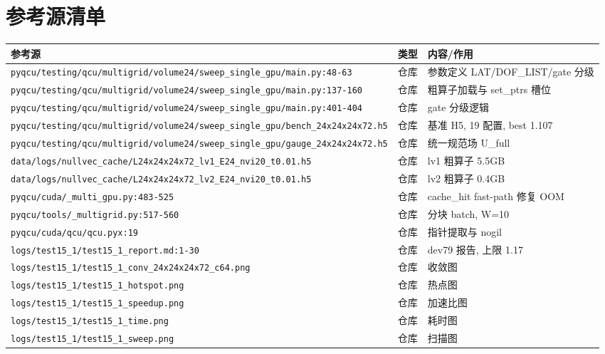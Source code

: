 \documentclass[UTF8]{ctexart}
\begin{document}
\section{参考源清单}
\begin{xltabular}{\textwidth}{llX}
\toprule
\textcolor{evidence}{参考源} & 类型 & 内容/作用 \\
\midrule
\endhead
\texttt{\nolinkurl{pyqcu/testing/qcu/multigrid/volume24/sweep_single_gpu/main.py:48-63}} & 仓库 & 参数定义 LAT/DOF\_LIST/gate 分级 \\
\texttt{\nolinkurl{pyqcu/testing/qcu/multigrid/volume24/sweep_single_gpu/main.py:137-160}} & 仓库 & 粗算子加载与 set\_ptrs 槽位 \\
\texttt{\nolinkurl{pyqcu/testing/qcu/multigrid/volume24/sweep_single_gpu/main.py:401-404}} & 仓库 & gate 分级逻辑 \\
\texttt{\nolinkurl{pyqcu/testing/qcu/multigrid/volume24/sweep_single_gpu/bench_24x24x24x72.h5}} & 仓库 & 基准 H5, 19 配置, best 1.107 \\
\texttt{\nolinkurl{pyqcu/testing/qcu/multigrid/volume24/sweep_single_gpu/gauge_24x24x24x72.h5}} & 仓库 & 统一规范场 U\_full \\
\texttt{\nolinkurl{data/logs/nullvec_cache/L24x24x24x72_lv1_E24_nvi20_t0.01.h5}} & 仓库 & lv1 粗算子 5.5GB \\
\texttt{\nolinkurl{data/logs/nullvec_cache/L24x24x24x72_lv2_E24_nvi20_t0.01.h5}} & 仓库 & lv2 粗算子 0.4GB \\
\texttt{\nolinkurl{pyqcu/cuda/_multi_gpu.py:483-525}} & 仓库 & cache\_hit fast-path 修复 OOM \\
\texttt{\nolinkurl{pyqcu/tools/_multigrid.py:517-560}} & 仓库 & 分块 batch, W=10 \\
\texttt{\nolinkurl{pyqcu/cuda/qcu/qcu.pyx:19}} & 仓库 & 指针提取与 nogil \\
\texttt{\nolinkurl{logs/test15_1/test15_1_report.md:1-30}} & 仓库 & dev79 报告, 上限 1.17 \\
\texttt{\nolinkurl{logs/test15_1/test15_1_conv_24x24x24x72_c64.png}} & 仓库 & 收敛图 \\
\texttt{\nolinkurl{logs/test15_1/test15_1_hotspot.png}} & 仓库 & 热点图 \\
\texttt{\nolinkurl{logs/test15_1/test15_1_speedup.png}} & 仓库 & 加速比图 \\
\texttt{\nolinkurl{logs/test15_1/test15_1_time.png}} & 仓库 & 耗时图 \\
\texttt{\nolinkurl{logs/test15_1/test15_1_sweep.png}} & 仓库 & 扫描图 \\

\end{xltabular}
\end{document}
